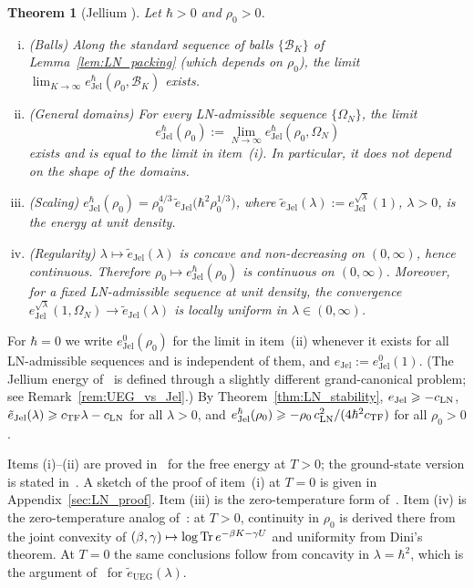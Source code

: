 \documentclass[final,reqno]{amsart}
\newtheorem{theorem}{Theorem}[section]
\theoremstyle{remark}
\theoremstyle{definition}
\renewcommand{\ge}{\geqslant}
\newcommand{\TF}{\mathrm{TF}}
\newcommand{\UEG}{\mathrm{UEG}}
\newcommand{\Jel}{\mathrm{Jel}}
\begin{document}
\begin{theorem}[Jellium {\cite[Secs.~5.1--5.4]{lieb1975thermodynamic}}]\label{thm:LN_main}
Let $\hbar>0$ and $\rho_0>0$.
\begin{enumerate}[(i)]
\item (Balls) Along the standard sequence of balls $\{\mathcal B_K\}$ of Lemma~\ref{lem:LN_packing} (which depends on $\rho_0$), the limit $\lim_{K\to\infty}e^\hbar_\Jel(\rho_0,\mathcal B_K)$ exists.
\item (General domains) For every LN-admissible sequence $\{\Omega_N\}$, the limit
\[
\boxed{e^\hbar_\Jel(\rho_0):=\lim_{N\to\infty}e^\hbar_\Jel(\rho_0,\Omega_N)}
\]
exists and is equal to the limit in item~(i). In particular, it does not depend on the shape of the domains.
\item (Scaling) $e^\hbar_\Jel(\rho_0)=\rho_0^{4/3}\,\tilde e_\Jel\big(\hbar^2\rho_0^{1/3}\big)$, where $\tilde e_\Jel(\lambda):=e^{\sqrt\lambda}_\Jel(1)$, $\lambda>0$, is the energy at unit density.
\item (Regularity) $\lambda\mapsto \tilde e_\Jel(\lambda)$ is concave and non-decreasing on $(0,\infty)$, hence continuous. Therefore $\rho_0\mapsto e^\hbar_\Jel(\rho_0)$ is continuous on $(0,\infty)$. Moreover, for a fixed LN-admissible sequence at unit density, the convergence $e^{\sqrt\lambda}_\Jel(1,\Omega_N)\to \tilde e_\Jel(\lambda)$ is locally uniform in $\lambda\in(0,\infty)$.
\end{enumerate}
\end{theorem}

For $\hbar=0$ we write $e^0_\Jel(\rho_0)$ for the limit in item~(ii) whenever it exists for all LN-admissible sequences and is independent of them, and $e_\Jel:=e^0_\Jel(1)$. (The Jellium energy of~\cite{lewin2018statistical} is defined through a slightly different grand-canonical problem; see Remark~\ref{rem:UEG_vs_Jel}.) By Theorem~\ref{thm:LN_stability}, $e_\Jel\ge-c_{\rm LN}$, $\tilde e_\Jel(\lambda)\ge c_\TF\lambda-c_{\rm LN}$ for all $\lambda>0$, and $e^\hbar_\Jel(\rho_0)\ge-\rho_0\,c_{\rm LN}^2/(4\hbar^2c_\TF)$ for all $\rho_0>0$.

Items (i)--(ii) are proved in~\cite[Secs.~5.1--5.2]{lieb1975thermodynamic} for the free energy at $T>0$; the ground-state version is stated in~\cite[Sec.~5.4(iii)]{lieb1975thermodynamic}. A sketch of the proof of item~(i) at $T=0$ is given in Appendix~\ref{sec:LN_proof}. Item (iii) is the zero-temperature form of~\cite[Eqs.~(62)--(64)]{lieb1975thermodynamic}. Item (iv) is the zero-temperature analog of~\cite[Secs.~3.4.1 and~5.3]{lieb1975thermodynamic}: at $T>0$, continuity in $\rho_0$ is derived there from the joint convexity of $(\beta,\gamma)\mapsto\log\Tr e^{-\beta K-\gamma U}$ and uniformity from Dini's theorem. At $T=0$ the same conclusions follow from concavity in $\lambda=\hbar^2$, which is the argument of~\cite{lewin2018statistical} for $\tilde e_\UEG(\lambda)$.
\end{document}
